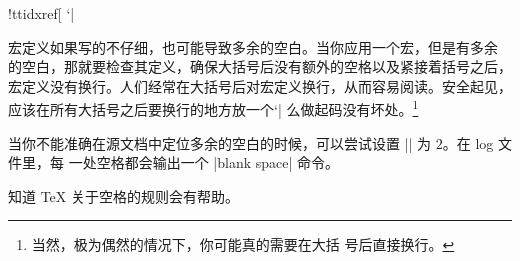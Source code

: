 {\recat!ttidxref[%
`|%


宏定义如果写的不仔细，也可能导致多余的空白。当你应用一个宏，但是有多余
的空白，那就要检查其定义，确保大括号后没有额外的空格以及紧接着括号之后，
宏定义没有换行。人们经常在大括号后对宏定义换行，从而容易阅读。安全起见，
应该在所有大括号之后要换行的地方放一个`|%
么做起码没有坏处。\footnote{当然，极为偶然的情况下，你可能真的需要在大括
  号后直接换行。}


当你不能准确在源文档中定位多余的空白的时候，可以尝试设置
|\tracingcommands| \ctsref{\tracingcommands} 为 $2$。在 log 文件里，每
一处空格都会输出一个 |{blank space}| 命令。


知道 \TeX{} 关于空格的规则会有帮助。


}
